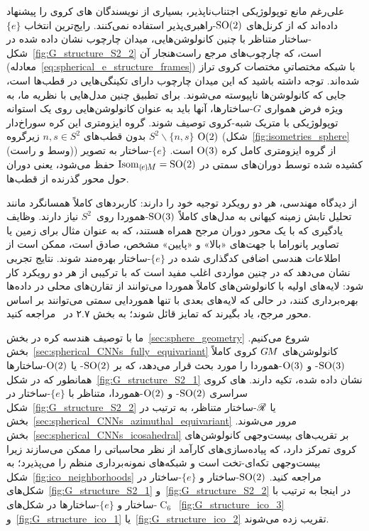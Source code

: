 علی‌رغم مانع توپولوژیکی اجتناب‌ناپذیر، بسیاری از نویسندگان های کروی را پیشنهاد داده‌اند که از کرنل‌های $\operatorname{SO}(2)$-راهبری‌پذیر استفاده نمی‌کنند.
رایج‌ترین انتخاب $\{e\}$-ساختار متناظر با چنین کانولوشن‌هایی، میدان چارچوب نشان داده شده در شکل~\ref{fig:G_structure_S2_2} است، که چارچوب‌های مرجع راست‌هنجار آن (معادله~\eqref{eq:spherical_e_structure_frames}) با شبکه مختصاتیِ مختصات کروی تراز شده‌اند.
توجه داشته باشید که این میدان چارچوب دارای تکینگی‌هایی در قطب‌ها است، جایی که کانولوشن‌ها ناپیوسته می‌شوند.
برای تطبیق چنین مدل‌هایی با نظریه ما، به ویژه فرض همواری $G$-ساختارها، آنها باید به عنوان کانولوشن‌هایی روی یک استوانه توپولوژیکی با متریک شبه-کروی توصیف شوند.
گروه ایزومتری این کره سوراخ‌دار $S^2 \backslash \{n,s\}$ بدون قطب‌های $n,s \in S^2$ زیرگروه $\operatorname{O}(2)$ (شکل~\ref{fig:isometries_sphere} (وسط و راست)) از گروه ایزومتری کامل کره $\operatorname{O}(3)$ است.
$\{e\}$-ساختار به تصویر کشیده شده توسط دوران‌های سمتی در $\IsomeM = \SO2$ حفظ می‌شود، یعنی دوران حول محور گذرنده از قطب‌ها.

از دیدگاه مهندسی، هر دو رویکرد توجیه خود را دارند:
کاربردهای کاملاً همسانگرد مانند تحلیل تابش زمینه کیهانی به مدل‌های کاملاً $\operatorname{SO}(3)$-هموردا روی~$S^2$ نیاز دارند.
وظایف یادگیری که با یک محور دوران مرجح همراه هستند، که به عنوان مثال برای زمین یا تصاویر پانوراما با جهت‌های «بالا» و «پایین» مشخص، صادق است، ممکن است از اطلاعات هندسی اضافی کدگذاری شده در $\{e\}$-ساختار بهره‌مند شوند.
نتایج تجربی نشان می‌دهد که در چنین مواردی اغلب مفید است که با ترکیبی از هر دو رویکرد کار شود:
لایه‌های اولیه با کانولوشن‌های کاملاً هموردا می‌توانند از تقارن‌های محلی در داده‌ها بهره‌برداری کنند، در حالی که لایه‌های بعدی با تنها هموردایی سمتی می‌توانند بر اساس محور مرجح، یاد بگیرند که تمایز قائل شوند؛ به بخش ۲.۷ در~\cite{3d_steerableCNNs} مراجعه کنید.


\etocsettocstyle{}{} %
\localtableofcontents


ما با توصیف هندسه کره در بخش~\ref{sec:sphere_geometry} شروع می‌کنیم.
بخش~\ref{sec:spherical_CNNs_fully_equivariant} کانولوشن‌های $G\mkern-1.4muM$ کروی کاملاً $\operatorname{SO}(3)$- و $\operatorname{O}(3)$-هموردا را مورد بحث قرار می‌دهد، که بر $\operatorname{SO}(2)$- یا $\operatorname{O}(2)$-ساختارها همانطور که در شکل~\ref{fig:G_structure_S2_1} نشان داده شده، تکیه دارند.
های کروی سراسری $\operatorname{SO}(2)$- و $\operatorname{O}(2)$-هموردا، متناظر با $\{e\}$-ساختار در شکل~\ref{fig:G_structure_S2_2} یا $\mathscr{R}$-ساختار متناظر، به ترتیب در بخش~\ref{sec:spherical_CNNs_azimuthal_equivariant} مرور می‌شوند.
بخش~\ref{sec:spherical_CNNs_icosahedral} بر تقریب‌های بیست‌وجهی کانولوشن‌های کروی تمرکز دارد، که پیاده‌سازی‌های کارآمد از نظر محاسباتی را ممکن می‌سازند زیرا بیست‌وجهی تکه‌ای-تخت است و شبکه‌های نمونه‌برداری منظم را می‌پذیرد؛ به شکل~\ref{fig:ico_neighborhoods} مراجعه کنید.
$\operatorname{SO}(2)$-ساختار و $\{e\}$-ساختار در شکل‌های~\ref{fig:G_structure_S2_1} و~\ref{fig:G_structure_S2_2} در اینجا به ترتیب با $\operatorname{C}_6$-ساختار و $\{e\}$-ساختارها در شکل‌های~\ref{fig:G_structure_ico_3} و~\ref{fig:G_structure_ico_1} یا~\ref{fig:G_structure_ico_2} تقریب زده می‌شوند.

